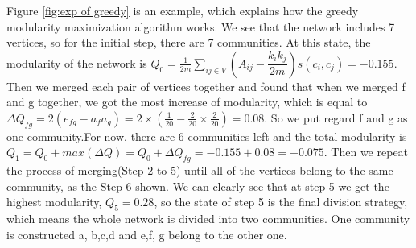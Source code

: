 \documentclass[12pt,oneside,final]{vlsithesis}
\begin{document}
Figure \ref{fig:exp of greedy} is an example, which explains how the greedy modularity maximization algorithm works. We see that the network includes 7 vertices, so for the initial step, there are 7 communities. At this state, the modularity of the network is $Q_{0} =  \frac{1}{2m}\sum_{ij \in V}(A_{ij} - \dfrac{k_{i}k_{j}}{2m}) s(c_{i}, c_{j}) = -0.155$. Then we merged each pair of vertices together and found that when we merged f and g together, we got the most increase of modularity, which is equal to $\Delta Q_{fg} = 2(e_{fg} - a_{f}a_{g}) = 2\times(\frac{1}{20} -  \frac{2}{20} \times \frac{2}{20}) = 0.08$. So we put regard f and g as one community.For now, there are 6 communities left and the total modularity is $Q_{1} = Q_{0} + max(\Delta Q) = Q_{0} + \Delta Q_{fg} = -0.155 + 0.08 = -0.075$. Then we repeat the process of merging(Step 2 to 5) until all of the vertices belong to the same community, as the Step 6 shown. We can clearly see that at step 5 we get the highest modularity, $Q_{5} = 0.28$, so the state of step 5 is the final division strategy, which means the whole network is divided into two communities. One community is constructed a, b,c,d and e,f, g belong to the other one.
\end{document}
